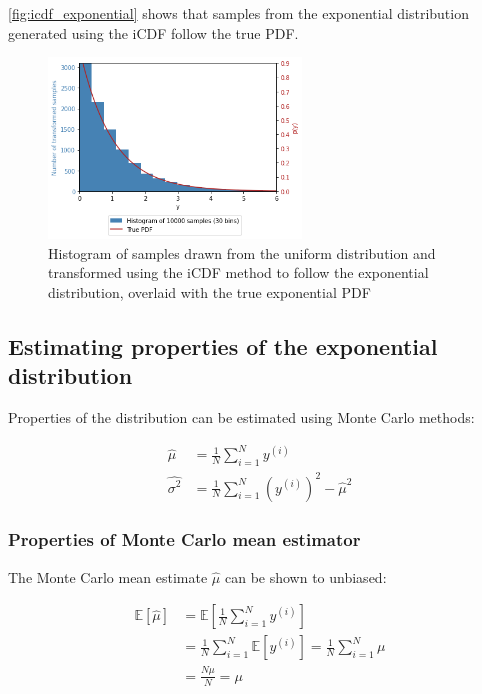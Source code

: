 \documentclass[a4paper]{article}
\begin{document}
\autoref{fig:icdf_exponential} shows that samples from the exponential distribution generated using the iCDF follow the
true PDF.

\begin{figure}[h]
    \centering
    \includegraphics[width=0.6\textwidth]{figures/icdf_exponential.png}
    \caption{Histogram of samples drawn from the uniform distribution and transformed using the iCDF method to follow the
    exponential distribution, overlaid with the true exponential PDF}
    \label{fig:icdf_exponential}
\end{figure}

\subsection{Estimating properties of the exponential distribution}

Properties of the distribution can be estimated using Monte Carlo methods:

\begin{align*}
    \hat{\mu} &= \frac{1}{N} \sum_{i=1}^N y^{(i)} \\
    \hat{\sigma^2} &= \frac{1}{N} \sum_{i=1}^N \left(y^{(i)}\right)^2 - \hat{\mu}^2
\end{align*}

\subsubsection{Properties of Monte Carlo mean estimator}

The Monte Carlo mean estimate $\hat{\mu}$ can be shown to unbiased:

\begin{align*}
    \mathbb{E}[\hat{\mu}] & = \mathbb{E}\left[\frac{1}{N} \sum_{i=1}^N y^{(i)}\right] \\
    &= \frac{1}{N} \sum_{i=1}^N \mathbb{E}\left[y^{(i)}\right] = \frac{1}{N} \sum_{i=1}^N \mu \\
    &= \frac{N\mu}{N} = \mu
\end{align*}
\end{document}
